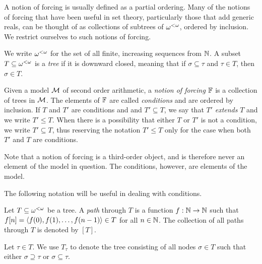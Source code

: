 A notion of forcing is usually defined as a partial ordering.
Many of the notions of forcing that have been useful in set theory,
particularly those that add generic reals,
can be thought of as collections of subtrees of $\OO$, ordered by inclusion.
We restrict ourselves to such notions of forcing.

\begin{definition}
We write $\OO$\index{$\OO$} for the set of all finite, increasing sequences from $\mathbb{N}$.
A subset $T\subseteq\omega^{<\omega}$ is a \textit{tree}
if it is downward closed, meaning that if
$\sigma\subseteq\tau$ and $\tau\in T$, then $\sigma\in T$.

Given a model $\mathcal{M}$ of second order arithmetic,
a \textit{notion of forcing} $\mathbb{F}$ is a collection of trees in $\mathcal{M}$.
The elements of $\mathbb{F}$ are called \textit{conditions} and are ordered by inclusion.
If $T$ and $T'$ are conditions and and $T'\subseteq T$, we say that $T'$ \textit{extends} $T$
and we write $T'\leq T$.
When there is a possibility that either $T$ or $T'$ is not a condition,
we write $T'\subseteq T$, thus reserving the notation $T'\leq T$ only
for the case when both $T'$ and $T$ are conditions.
\end{definition}

Note that a notion of forcing is a third-order object,
and is therefore never an element of the model in question.
The conditions, however, are elements of the model.

The following notation will be useful in dealing with conditions.
\begin{definition}\label{D:treestuff}
Let $T\subseteq\omega^{<\omega}$ be a tree.
A \textit{path} through $T$ is a function $f:\mathbb{N}\to\mathbb{N}$
such that $f[n]=\left\langle f(0),f(1),\ldots,f(n-1)\right\rangle\in T$ for all $n\in\mathbb{N}$.
The collection of all paths through $T$ is denoted by $[T]$\index{$[T]$}.

Let $\tau\in T$.
We use $T_\tau$ to denote the tree consisting of all nodes
$\sigma\in T$ such that either $\sigma\supseteq\tau$ or $\sigma\subseteq\tau$.
\end{definition}

